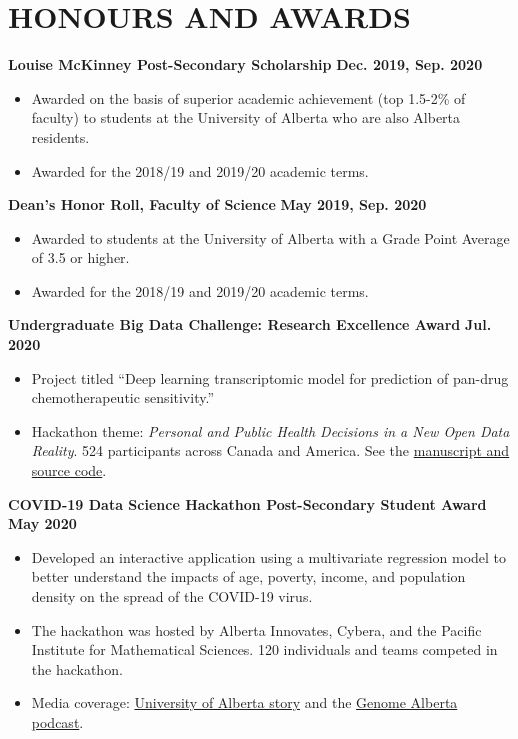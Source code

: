 \documentclass{article}
\begin{document}
\section*{\textcolor{my_colour}{HONOURS AND AWARDS}}
\vspace{-.25em} \hrulefill \vspace{.75em}

    \textbf{Louise McKinney Post-Secondary Scholarship} \hfill \textbf{Dec. 2019, Sep. 2020}
    \begin{itemize}
        \item Awarded on the basis of superior academic achievement (top 1.5-2\% of faculty) to students at the University of Alberta who are also Alberta residents.
        \item Awarded for the 2018/19 and 2019/20 academic terms.
    \end{itemize}

    \textbf{Dean's Honor Roll, Faculty of Science} \hfill \textbf{May 2019, Sep. 2020}
    \begin{itemize}
        \item Awarded to students at the University of Alberta with a Grade Point Average of 3.5 or higher.
        \item Awarded for the 2018/19 and 2019/20 academic terms.
    \end{itemize}

    \textbf{Undergraduate Big Data Challenge: Research Excellence Award} \hfill \textbf{Jul. 2020}
    \begin{itemize}
        \item Project titled ``Deep learning transcriptomic model for prediction of pan-drug chemotherapeutic sensitivity.''
        \item Hackathon theme: \textit{Personal and Public Health Decisions in a New Open Data Reality}. 524 participants across Canada and America. See the \href{https://github.com/tig3r66/youreka_genes}{manuscript and source code}.
    \end{itemize}

    \textbf{COVID-19 Data Science Hackathon Post-Secondary Student Award} \hfill \textbf{May 2020}
    \begin{itemize}
        \item Developed an interactive application using a multivariate regression model to better understand the impacts of age, poverty, income, and population density on the spread of the COVID-19 virus.
        \item The hackathon was hosted by Alberta Innovates, Cybera, and the Pacific Institute for Mathematical Sciences. 120 individuals and teams competed in the hackathon.
        \item Media coverage: \href{https://www.folio.ca/students-develop-online-tool-to-predict-covid-19-spread-based-on-demographics/}{University of Alberta story} and the \href{https://genomealberta.ca/genomics/genomics_blog_08182001.aspx}{Genome Alberta podcast}.
    \end{itemize}
\end{document}
